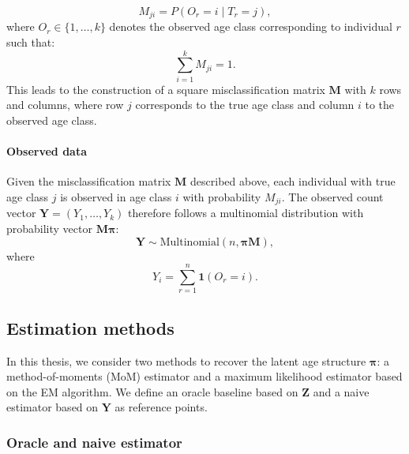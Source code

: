 \documentclass[11pt,a4paper]{article}
\begin{document}
\[
M_{ji} = P(O_r = i \mid T_r = j),
\] 
where $O_r \in \{1,\dots,k\}$ denotes the observed age class corresponding to individual $r$ such that:
\[
\sum_{i = 1}^{k} M_{ji} = 1.
\]
This leads to the construction of a square misclassification matrix $\boldsymbol{M}$ with $k$ rows and columns, where row $j$ corresponds to the true age class and column $i$ to the observed age class.

\paragraph{Observed data} \label{par:observed_dist}

Given the misclassification matrix $\boldsymbol{M}$ described above, each individual with true age class $j$ is observed in age class $i$ with probability $M_{ji}$. The observed count vector $\mathbf{Y} = (Y_1, \dots, Y_k)$ therefore follows a multinomial distribution with probability vector $\boldsymbol{M}\boldsymbol{\pi}$:
\begin{equation}
	\mathbf{Y} \sim \text{Multinomial}(n, \boldsymbol{\pi} \boldsymbol{M}),
	\label{eq:observed_distribution}
\end{equation}
where 
\[
Y_i = \sum_{r=1}^{n} \boldsymbol{1}(O_r = i).
\]

\subsection{Estimation methods}

In this thesis, we consider two methods to recover the latent age structure $\boldsymbol{\pi}$: a method-of-moments (MoM) estimator and a maximum likelihood estimator based on the EM algorithm. We define an oracle baseline based on $\boldsymbol{Z}$ and a naive estimator based on $\boldsymbol{Y}$ as reference points.

\subsubsection{Oracle and naive estimator}
\end{document}
